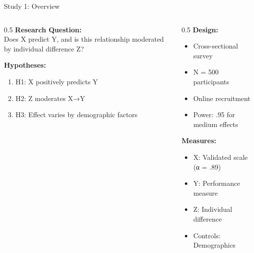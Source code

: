 \documentclass[aspectratio=169,12pt]{beamer}
\begin{document}
\begin{frame}{Study 1: Overview}
  \begin{columns}[T]
    
    \begin{column}{0.5\textwidth}
      \textbf{Research Question:}\\
      Does X predict Y, and is this relationship moderated by individual difference Z?
      
      \vspace{0.5cm}
      
      \textbf{Hypotheses:}
      \begin{enumerate}
        \item H1: X positively predicts Y
        \item H2: Z moderates X→Y
        \item H3: Effect varies by demographic factors
      \end{enumerate}
    \end{column}
    
    \begin{column}{0.5\textwidth}
      \textbf{Design:}
      \begin{itemize}
        \item Cross-sectional survey
        \item N = 500 participants
        \item Online recruitment
        \item Power: .95 for medium effects
      \end{itemize}
      
      \vspace{0.3cm}
      
      \textbf{Measures:}
      \begin{itemize}
        \item X: Validated scale (α = .89)
        \item Y: Performance measure
        \item Z: Individual difference
        \item Controls: Demographics
      \end{itemize}
    \end{column}
    
  \end{columns}
\end{frame}
\end{document}
